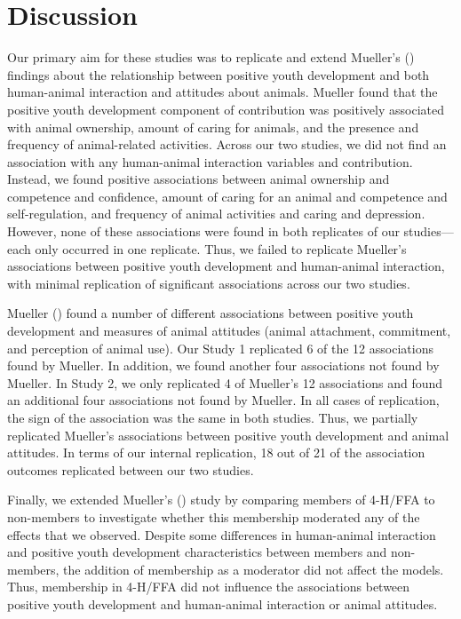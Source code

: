 \documentclass[
  jou,
  longtable,
  nolmodern,
  notxfonts,
  notimes,
  colorlinks=true,linkcolor=blue,citecolor=blue,urlcolor=blue]{apa7}
\begin{document}
\section{Discussion}\label{discussion}

Our primary aim for these studies was to replicate and extend Mueller's
() findings about the relationship
between positive youth development and both human-animal interaction and
attitudes about animals. Mueller found that the positive youth
development component of contribution was positively associated with
animal ownership, amount of caring for animals, and the presence and
frequency of animal-related activities. Across our two studies, we did
not find an association with any human-animal interaction variables and
contribution. Instead, we found positive associations between animal
ownership and competence and confidence, amount of caring for an animal
and competence and self-regulation, and frequency of animal activities
and caring and depression. However, none of these associations were
found in both replicates of our studies---each only occurred in one
replicate. Thus, we failed to replicate Mueller's associations between
positive youth development and human-animal interaction, with minimal
replication of significant associations across our two studies.

Mueller () found a number of different
associations between positive youth development and measures of animal
attitudes (animal attachment, commitment, and perception of animal use).
Our Study 1 replicated 6 of the 12 associations found by Mueller. In
addition, we found another four associations not found by Mueller. In
Study 2, we only replicated 4 of Mueller's 12 associations and found an
additional four associations not found by Mueller. In all cases of
replication, the sign of the association was the same in both studies.
Thus, we partially replicated Mueller's associations between positive
youth development and animal attitudes. In terms of our internal
replication, 18 out of 21 of the association outcomes replicated between
our two studies.

Finally, we extended Mueller's () study
by comparing members of 4-H/FFA to non-members to investigate whether
this membership moderated any of the effects that we observed. Despite
some differences in human-animal interaction and positive youth
development characteristics between members and non-members, the
addition of membership as a moderator did not affect the models. Thus,
membership in 4-H/FFA did not influence the associations between
positive youth development and human-animal interaction or animal
attitudes.
\end{document}
